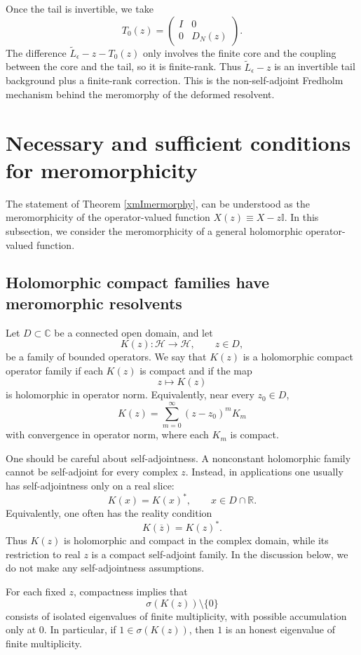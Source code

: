 \documentclass[JHEP,12pt]{article}
\begin{document}
Once the tail is invertible, we take
\[
T_0(z)=
\begin{pmatrix}
I & 0\\
0 & D_N(z)
\end{pmatrix}.
\]
The difference \(\widetilde L_\epsilon-z-T_0(z)\) only involves the finite core
and the coupling between the core and the tail, so it is finite-rank. Thus
\(\widetilde L_\epsilon-z\) is an invertible tail background plus a finite-rank
correction. This is the non-self-adjoint Fredholm mechanism behind the
meromorphy of the deformed resolvent.


\section{Necessary and sufficient conditions for meromorphicity}

The statement of Theorem \ref{xmImermorphy}, can be understood as the meromorphicity of the operator-valued function $X(z)\equiv X-z \mathbb{I}$. In this subsection, we consider the meromorphicity of a general holomorphic operator-valued function.

\subsection{Holomorphic compact families have meromorphic resolvents}

Let \(D\subset\mathbb C\) be a connected open domain, and let
\[
K(z):\mathcal H\to\mathcal H,
\qquad z\in D,
\]
be a family of bounded operators. We say that \(K(z)\) is a holomorphic compact
operator family if each \(K(z)\) is compact and if the map
\[
z\mapsto K(z)
\]
is holomorphic in operator norm. Equivalently, near every \(z_0\in D\),
\[
K(z)=\sum_{m=0}^{\infty}(z-z_0)^m K_m
\]
with convergence in operator norm, where each \(K_m\) is compact. 

One should be careful about self-adjointness. A nonconstant holomorphic family
cannot be self-adjoint for every complex \(z\). Instead, in applications one
usually has self-adjointness only on a real slice:
\[
K(x)=K(x)^\ast,
\qquad x\in D\cap\mathbb R .
\]
Equivalently, one often has the reality condition
\[
K(\overline z)=K(z)^\ast .
\]
Thus \(K(z)\) is holomorphic and compact in the complex domain, while its
restriction to real \(z\) is a compact self-adjoint family. In the discussion below, we do not make any self-adjointness assumptions.

For each fixed \(z\), compactness implies that
\[
\sigma(K(z))\setminus\{0\}
\]
consists of isolated eigenvalues of finite multiplicity, with possible
accumulation only at \(0\). In particular, if \(1\in\sigma(K(z))\), then
\(1\) is an honest eigenvalue of finite multiplicity.
\end{document}
